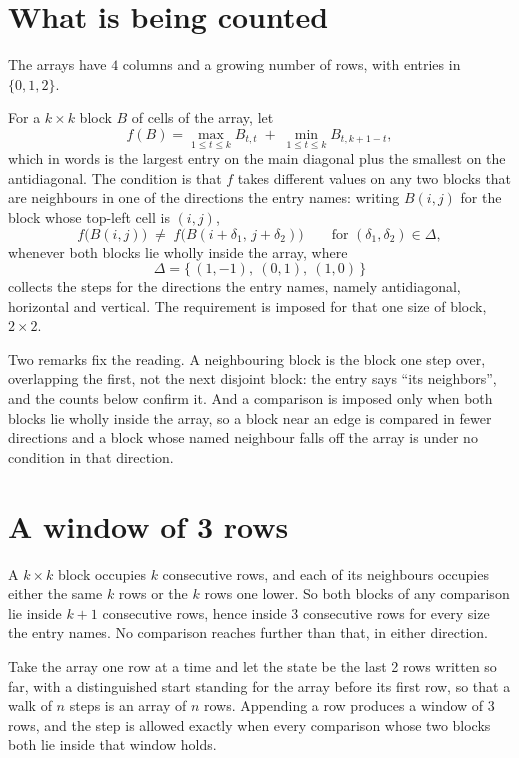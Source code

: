 \documentclass[11pt,a4paper]{article}
\theoremstyle{plain}
\theoremstyle{definition}
\begin{document}
\section{What is being counted}

The arrays have $4$ columns and a growing number of rows, with entries in $\{0,1,2\}$.

For a $k\times k$ block $B$ of cells of the array, let
\[
f(B)=\max_{1\le t\le k}B_{t,t}\;+\;\min_{1\le t\le k}B_{t,k+1-t} ,
\]
which in words is the largest entry on the main diagonal plus the smallest on the antidiagonal. The condition is that $f$ takes different values on any two blocks that
are neighbours in one of the directions the entry names: writing $B(i,j)$ for the block whose
top-left cell is $(i,j)$,
\[
f\bigl(B(i,j)\bigr)\;\neq\;f\bigl(B(i+\delta_1,\,j+\delta_2)\bigr)
\qquad\text{for }(\delta_1,\delta_2)\in\Delta,
\]
whenever both blocks lie wholly inside the array, where
\[
\Delta=\{\,(1,-1),\ (0,1),\ (1,0)\,\}
\]
collects the steps for the directions the entry names, namely antidiagonal, horizontal and vertical. The
requirement is imposed for that one size of block, $2\times2$.

Two remarks fix the reading. A neighbouring block is the block one step over, overlapping the
first, not the next disjoint block: the entry says ``its neighbors'', and the counts below
confirm it. And a comparison is imposed only when both blocks lie wholly inside the array, so a
block near an edge is compared in fewer directions and a block whose named neighbour falls off
the array is under no condition in that direction.

\section{A window of 3 rows}

A $k\times k$ block occupies $k$ consecutive rows, and each of its neighbours occupies either
the same $k$ rows or the $k$ rows one lower. So both blocks of any comparison lie inside $k+1$
consecutive rows, hence inside $3$ consecutive rows for every size the entry names. No
comparison reaches further than that, in either direction.

Take the array one row at a time and let the state be the last 2 rows written so far, with a
distinguished start standing for the array before its first row, so that a walk of $n$ steps is
an array of $n$ rows. Appending a row produces a window of $3$ rows, and the step is
allowed exactly when every comparison whose two blocks both lie inside that window holds.
\end{document}
